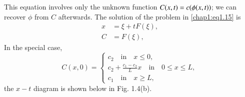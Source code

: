 This equation involves only the unknown function
$C(x,t)=c\break(\phi(x,t))$; we can recover $\phi$ from $C$ afterwards. The
solution of the problem in \eqref{chap1:eq1.15} is  
\begin{equation}
\begin{aligned}
x &=\xi +tF(\xi),\\
C &= F(\xi),
\end{aligned}\tag{1.16}\label{chap1:eq1.16}
\end{equation}
In the special case,
\begin{equation*}
C(x,0)=
\begin{cases}
c_2\quad\text{in}\quad x\leq 0,\\
c_2 +\frac{c_1-c_2}{L}x\quad\text{in}\quad 0\leq x\leq L,\\
c_1\quad\text{in}\quad x\geq L,
\end{cases}
\end{equation*}
the $x-t$ diagram is shown below in Fig. 1.4(b).
